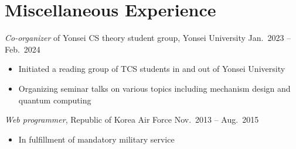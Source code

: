 \documentclass{article}
\newcommand{\killinitspace}{-0.7em}
\begin{document}
\section{Miscellaneous Experience}
\textsl{Co-organizer} of Yonsei CS theory student group, Yonsei University \hfill Jan.~2023 -- Feb.~2024
\vspace{\killinitspace}
\begin{itemize}
\item Initiated a reading group of TCS students in and out of Yonsei University
\item Organizing seminar talks on various topics including mechanism design and quantum computing
\end{itemize}

\textsl{Web programmer}, Republic of Korea Air Force \hfill Nov.~2013 -- Aug.~2015
\vspace{\killinitspace}
\begin{itemize}
\item In fulfillment of mandatory military service
\end{itemize}
\end{document}
